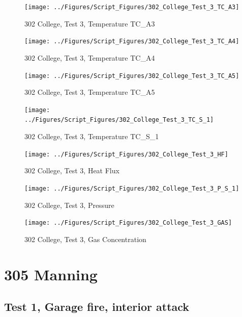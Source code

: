 \documentclass[12pt,oneside]{book}
\begin{document}
\begin{figure}[!ht]
\texttt{[image: ../Figures/Script\_Figures/302\_College\_Test\_3\_TC\_A3]}
\caption{302 College, Test 3, Temperature TC\_A3}
\label{fig:302_College_Test_3_TC_A3}
\end{figure}

\begin{figure}[!ht]
\texttt{[image: ../Figures/Script\_Figures/302\_College\_Test\_3\_TC\_A4]}
\caption{302 College, Test 3, Temperature TC\_A4}
\label{fig:302_College_Test_3_TC_A4}
\end{figure}

\begin{figure}[!ht]
\texttt{[image: ../Figures/Script\_Figures/302\_College\_Test\_3\_TC\_A5]}
\caption{302 College, Test 3, Temperature TC\_A5}
\label{fig:302_College_Test_3_TC_A5}
\end{figure}

\begin{figure}[!ht]
\texttt{[image: ../Figures/Script\_Figures/302\_College\_Test\_3\_TC\_S\_1]}
\caption{302 College, Test 3, Temperature TC\_S\_1}
\label{fig:302_College_Test_3_TC_S_1}
\end{figure}

\begin{figure}[!ht]
\texttt{[image: ../Figures/Script\_Figures/302\_College\_Test\_3\_HF]}
\caption{302 College, Test 3, Heat Flux}
\label{fig:302_College_Test_3_HF}
\end{figure}

\begin{figure}[!ht]
\texttt{[image: ../Figures/Script\_Figures/302\_College\_Test\_3\_P\_S\_1]}
\caption{302 College, Test 3, Pressure}
\label{fig:302_College_Test_3_P_S_1}
\end{figure}

\begin{figure}[!ht]
\texttt{[image: ../Figures/Script\_Figures/302\_College\_Test\_3\_GAS]}
\caption{302 College, Test 3, Gas Concentration}
\label{fig:302_College_Test_3_GAS}
\end{figure}


\clearpage


\section{305 Manning}

\subsection{Test 1, Garage fire, interior attack}
\end{document}
